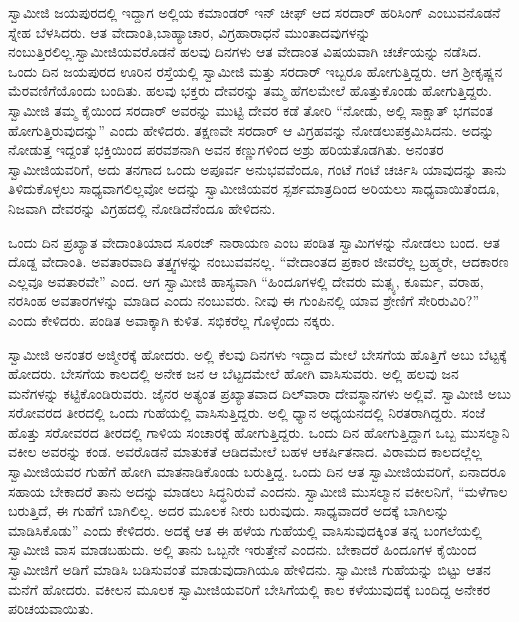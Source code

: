  ಸ್ವಾಮೀಜಿ ಜಯಪುರದಲ್ಲಿ ಇದ್ದಾಗ ಅಲ್ಲಿಯ ಕಮಾಂಡರ್ ಇನ್ ‍ಚೀಫ್ ಆದ ಸರದಾರ್ ಹರಿಸಿಂಗ್ ಎಂಬುವನೊಡನೆ ಸ್ನೇಹ ಬೆಳಸಿದರು. ಆತ ವೇದಾಂತಿ,\break ಬಾಹ್ಯಾಚಾರ, ವಿಗ್ರಹಾರಾಧನೆ ಮುಂತಾದವುಗಳನ್ನು ನಂಬುತ್ತಿರಲಿಲ್ಲ.\break ಸ್ವಾಮೀಜಿಯವರೊಡನೆ ಹಲವು ದಿನಗಳು ಆತ ವೇದಾಂತ ವಿಷಯವಾಗಿ ಚರ್ಚೆಯನ್ನು ನಡೆಸಿದ. ಒಂದು ದಿನ ಜಯಪುರದ ಊರಿನ ರಸ್ತೆಯಲ್ಲಿ ಸ್ವಾಮೀಜಿ ಮತ್ತು ಸರದಾರ್ ಇಬ್ಬರೂ ಹೋಗುತ್ತಿದ್ದರು. ಆಗ ಶ‍್ರೀಕೃಷ್ಣನ ಮೆರವಣಿಗೆಯೊಂದು ಬಂದಿತು. ಹಲವು ಭಕ್ತರು ದೇವರನ್ನು ತಮ್ಮ ಹೆಗಲಮೇಲೆ ಹೊತ್ತುಕೊಂಡು ಹೋಗುತ್ತಿದ್ದರು. ಸ್ವಾಮೀಜಿ ತಮ್ಮ ಕೈಯಿಂದ ಸರದಾರ್ ಅವರನ್ನು ಮುಟ್ಟಿ ದೇವರ ಕಡೆ ತೋರಿ “ನೋಡು, ಅಲ್ಲಿ ಸಾಕ್ಷಾತ್ ಭಗವಂತ ಹೋಗುತ್ತಿರುವುದನ್ನು” ಎಂದು ಹೇಳಿದರು. ತಕ್ಷಣವೇ ಸರದಾರ್ ಆ ವಿಗ್ರಹವನ್ನು ನೋಡಲುಪಕ್ರಮಿಸಿದನು. ಅದನ್ನು ನೋಡುತ್ತ ಇದ್ದಂತೆ ಭಕ್ತಿಯಿಂದ ಪರವಶನಾಗಿ ಅವನ ಕಣ್ಣುಗಳಿಂದ ಅಶ್ರು ಹರಿಯತೊಡಗಿತು. ಅನಂತರ ಸ್ವಾಮೀಜಿಯವರಿಗೆ, ಅದು ತನಗಾದ ಒಂದು ಅಪೂರ್ವ ಅನುಭವವೆಂದೂ, ಗಂಟೆ ಗಂಟೆ ಚರ್ಚಿಸಿ ಯಾವುದನ್ನು ತಾನು ತಿಳಿದುಕೊಳ್ಳಲು ಸಾಧ್ಯವಾಗಲಿಲ್ಲವೋ ಅದನ್ನು ಸ್ವಾಮೀಜಿಯವರ ಸ್ಪರ್ಶಮಾತ್ರದಿಂದ ಅರಿಯಲು ಸಾಧ್ಯವಾಯಿತೆಂದೂ, ನಿಜವಾಗಿ ದೇವರನ್ನು ವಿಗ್ರಹದಲ್ಲಿ ನೋಡಿದೆನೆಂದೂ ಹೇಳಿದನು. 

 ಒಂದು ದಿನ ಪ್ರಖ್ಯಾತ ವೇದಾಂತಿಯಾದ ಸೂರಜ್ ನಾರಾಯಣ ಎಂಬ ಪಂಡಿತ ಸ್ವಾಮಿಗಳನ್ನು ನೋಡಲು ಬಂದ. ಆತ ದೊಡ್ದ ವೇದಾಂತಿ. ಅವತಾರವಾದಿ ತತ್ತ್ವಗಳನ್ನು ನಂಬುವವನಲ್ಲ. “ವೇದಾಂತದ ಪ್ರಕಾರ ಜೀವರೆಲ್ಲ ಬ್ರಹ್ಮರೇ, ಆದಕಾರಣ ಎಲ್ಲವೂ ಅವತಾರವೇ” ಎಂದ. ಆಗ ಸ್ವಾಮೀಜಿ ಹಾಸ್ಯವಾಗಿ “ಹಿಂದೂಗಳಲ್ಲಿ ದೇವರು ಮತ್ಸ್ಯ, ಕೂರ್ಮ, ವರಾಹ, ನರಸಿಂಹ ಅವತಾರಗಳನ್ನು ಮಾಡಿದ ಎಂದು ನಂಬುವರು. ನೀವು ಈ ಗುಂಪಿನಲ್ಲಿ ಯಾವ ಶ್ರೇಣಿಗೆ ಸೇರಿರುವಿರಿ?” ಎಂದು ಕೇಳಿದರು. ಪಂಡಿತ ಅವಾಕ್ಕಾಗಿ ಕುಳಿತ. ಸಭಿಕರೆಲ್ಲ ಗೊಳ್ಳೆಂದು ನಕ್ಕರು. 

 ಸ್ವಾಮೀಜಿ ಅನಂತರ ಅಜ್ಮೀರಕ್ಕೆ ಹೋದರು. ಅಲ್ಲಿ ಕೆಲವು ದಿನಗಳು ಇದ್ದಾದ ಮೇಲೆ ಬೇಸಗೆಯ ಹೊತ್ತಿಗೆ ಅಬು ಬೆಟ್ಟಕ್ಕೆ ಹೋದರು. ಬೇಸಗೆಯ ಕಾಲದಲ್ಲಿ ಅನೇಕ ಜನ ಆ ಬೆಟ್ಟದಮೇಲೆ ಹೋಗಿ ವಾಸಿಸುವರು. ಅಲ್ಲಿ ಹಲವು ಜನ ಮನೆಗಳನ್ನು ಕಟ್ಟಿಕೊಂಡಿರುವರು. ಜೈನರ ಅತ್ಯಂತ ಪ್ರಖ್ಯಾತವಾದ ದಿಲ್‍ವಾರಾ ದೇವಸ್ಥಾನಗಳು ಅಲ್ಲಿವೆ. ಸ್ವಾಮೀಜಿ ಅಬು ಸರೋವರದ ತೀರದಲ್ಲಿ ಒಂದು ಗುಹೆಯಲ್ಲಿ ವಾಸಿಸುತ್ತಿದ್ದರು. ಅಲ್ಲಿ ಧ್ಯಾನ ಅಧ್ಯಯನದಲ್ಲಿ ನಿರತರಾಗಿದ್ದರು. ಸಂಜೆ ಹೊತ್ತು ಸರೋವರದ ತೀರದಲ್ಲಿ ಗಾಳಿಯ ಸಂಚಾರಕ್ಕೆ ಹೋಗುತ್ತಿದ್ದರು. ಒಂದು ದಿನ ಹೋಗುತ್ತಿದ್ದಾಗ ಒಬ್ಬ ಮುಸಲ್ಮಾನಿ ವಕೀಲ ಅವರನ್ನು ಕಂಡ. ಅವರೊಡನೆ ಮಾತುಕತೆ ಆಡಿದಮೇಲೆ ಬಹಳ ಆಕರ್ಷಿತನಾದ. ವಿರಾಮದ ಕಾಲದಲ್ಲೆಲ್ಲ ಸ್ವಾಮೀಜಿಯವರ ಗುಹೆಗೆ ಹೋಗಿ ಮಾತನಾಡಿಕೊಂಡು ಬರುತ್ತಿದ್ದ. ಒಂದು ದಿನ ಆತ ಸ್ವಾಮೀಜಿಯವರಿಗೆ, ಏನಾದರೂ ಸಹಾಯ ಬೇಕಾದರೆ ತಾನು ಅದನ್ನು ಮಾಡಲು ಸಿದ್ಧನಿರುವೆ ಎಂದನು. ಸ್ವಾಮೀಜಿ ಮುಸಲ್ಮಾನ ವಕೀಲನಿಗೆ, “ಮಳೆಗಾಲ ಬರುತ್ತಿದೆ, ಈ ಗುಹೆಗೆ ಬಾಗಿಲಿಲ್ಲ. ಅದರ ಮೂಲಕ ನೀರು ಬರುವುದು. ಸಾಧ್ಯವಾದರೆ ಅದಕ್ಕೆ ಬಾಗಿಲನ್ನು ಮಾಡಿಸಿಕೊಡು” ಎಂದು ಕೇಳಿದರು. ಅದಕ್ಕೆ ಆತ ಈ ಹಳೆಯ ಗುಹೆಯಲ್ಲಿ ವಾಸಿಸುವುದಕ್ಕಿಂತ ತನ್ನ ಬಂಗಲೆಯಲ್ಲಿ ಸ್ವಾಮೀಜಿ ವಾಸ ಮಾಡಬಹುದು. ಅಲ್ಲಿ ತಾನು ಒಬ್ಬನೇ ಇರುತ್ತೇನೆ ಎಂದನು. ಬೇಕಾದರೆ ಹಿಂದೂಗಳ ಕೈಯಿಂದ ಸ್ವಾಮೀಜಿಗೆ ಅಡಿಗೆ ಮಾಡಿಸಿ ಬಡಿಸುವಂತೆ ಮಾಡುವುದಾಗಿಯೂ ಹೇಳಿದನು. ಸ್ವಾಮೀಜಿ ಗುಹೆಯನ್ನು ಬಿಟ್ಟು ಆತನ ಮನೆಗೆ ಹೋದರು. ವಕೀಲನ ಮೂಲಕ ಸ್ವಾಮೀಜಿಯವರಿಗೆ ಬೇಸಿಗೆಯಲ್ಲಿ ಕಾಲ ಕಳೆಯುವುದಕ್ಕೆ ಬಂದಿದ್ದ ಅನೇಕರ ಪರಿಚಯವಾಯಿತು. 

